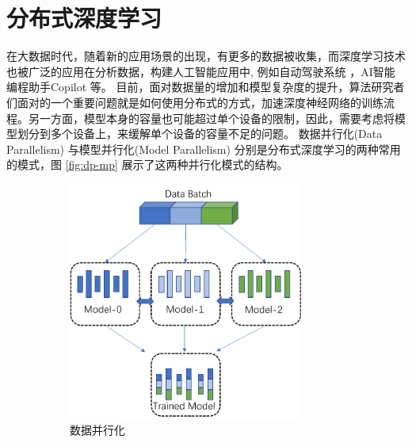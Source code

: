 \section{分布式深度学习}
在大数据时代，随着新的应用场景的出现，有更多的数据被收集，而深度学习技术也被广泛的应用在分析数据，构建人工智能应用中, 例如自动驾驶系统 ，AI智能编程助手Copilot 等。
目前，面对数据量的增加和模型复杂度的提升，算法研究者们面对的一个重要问题就是如何使用分布式的方式，加速深度神经网络的训练流程。另一方面，模型本身的容量也可能超过单个设备的限制，因此，需要考虑将模型划分到多个设备上，来缓解单个设备的容量不足的问题。
数据并行化(Data Parallelism)  与模型并行化(Model Parallelism)  分别是分布式深度学习的两种常用的模式，图 \ref{fig:dp-mp} 展示了这两种并行化模式的结构。
\begin{figure}
	\centering
	\caption{分布式深度学习的两种模式}
	\label{fig:dp-mp}
	\begin{subfigure}[b]{0.4\textwidth}
		\centering
		\includegraphics[width=0.85\textwidth]{figure/2-background/dp.pdf}
		\caption{数据并行化}
	\end{subfigure}
	\begin{subfigure}[b]{0.4\textwidth}
		\centering

\end{subfigure}
\end{figure}
